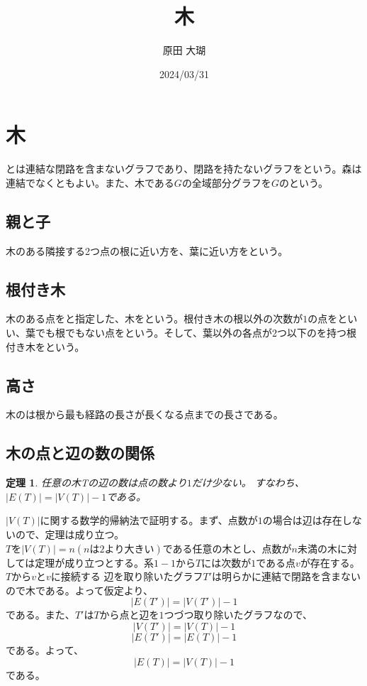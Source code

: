 \documentclass[twocolumn]{jarticle}
\title{木}
\author{原田 大瑚}
\date{2024/03/31}
\newtheorem{tem}{定理}
\begin{document}
\maketitle
\section{木}
とは連結な閉路を含まないグラフであり、閉路を持たないグラフをという。森は連結でなくともよい。また、木である$G$の全域部分グラフを$G$のという。\\

\subsection{親と子}
\indent 木のある隣接する2つ点の根に近い方を、葉に近い方をという。\\

\subsection{根付き木}
\indent 木のある点をと指定した、木をという。根付き木の根以外の次数が$1$の点をといい、葉でも根でもない点をという。そして、葉以外の各点が2つ以下のを持つ根付き木をという。\\

\subsection{高さ}
\indent 木のは根から最も経路の長さが長くなる点までの長さである。

\subsection{木の点と辺の数の関係}
\begin{tem}任意の木Tの辺の数は点の数より$1$だけ少ない。
すなわち、$|E(T)| = |V(T)| - 1$である。\end{tem}
$|V(T)|$に関する数学的帰納法で証明する。まず、点数が$1$の場合は辺は存在しないので、定理は成り立つ。\\
$T$を$|V(T)|=n(nは2より大きい)$である任意の木とし、点数が$n$未満の木に対しては定理が成り立つとする。系$1-1$から$T$には次数が$1$である点$v$が存在する。$T$から$v$と$v$に接続する
辺を取り除いたグラフ$T'$は明らかに連結で閉路を含まないので木である。よって仮定より、$$|E(T')|=|V(T')|-1$$である。また、$T'$は$T$から点と辺を$1$つづつ取り除いたグラフなので、
$$|V(T')|=|V(T)|-1$$
$$|E(T')|=|E(T)|-1$$である。よって、$$|E(T)|=|V(T)|-1$$である。
\end{document}
